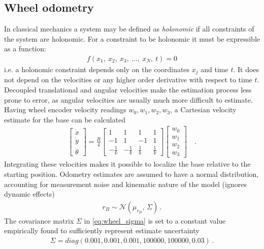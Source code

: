 \documentclass[times, utf8, diplomski, english]{fer}
\begin{document}
\subsection{Wheel odometry}
In classical mechanics a system may be defined as \textit{holonomic} if all constraints of the system are holonomic. For a constraint to be holonomic it must be expressible as a function:
\begin{align}
f(x_1,\ x_2,\ x_3,\ \ldots,\ x_N,\ t)=0
\end{align} 
i.e. a holonomic constraint depends only on the coordinates $x_j$ and time $t$. It does not depend on the velocities or any higher order derivative with respect to time $t$.
Decoupled translational and angular velocities make the estimation process less prone to error, as angular velocities are usually much more difficult to estimate.
Having wheel encoder velocity readings $w_0,w_1,w_2,w_3$, a Cartesian velocity estimate for the base can be calculated
\begin{align}
\begin{bmatrix}
\dot{x} \\
\dot{y} \\
\dot{\theta}
\end{bmatrix}
= 
\frac{R}{4}
\begin{bmatrix}
1 &1 &1 &1 \\
-1 &1 &-1 &1 \\
-\frac{1}{k} &-\frac{1}{k} &\frac{1}{k} &\frac{1}{k}
\end{bmatrix}
\begin{bmatrix}
w_0 \\
w_1 \\
w_2 \\ 
w_3
\end{bmatrix} \quad .
\end{align}
Integrating these velocities makes it possible to localize the base relative to the starting position.
Odometry estimates are assumed to have a normal distribution, accounting for measurement noise and kinematic nature of the model (ignores dynamic effects)
\begin{align}\label{eq:wheel_sigma}
r_{B} \sim \mathcal{N}(\mu_{r_B},\,\Sigma)\,.
\end{align}
The covariance matrix $\Sigma$ in \eqref{eq:wheel_sigma} is set to a constant value empirically found to sufficiently represent estimate uncertainty
\begin{align}
\Sigma 
=
diag\left(0.001,0.001,0.001,100000,100000,0.03\right)\,.
\end{align}
\end{document}
